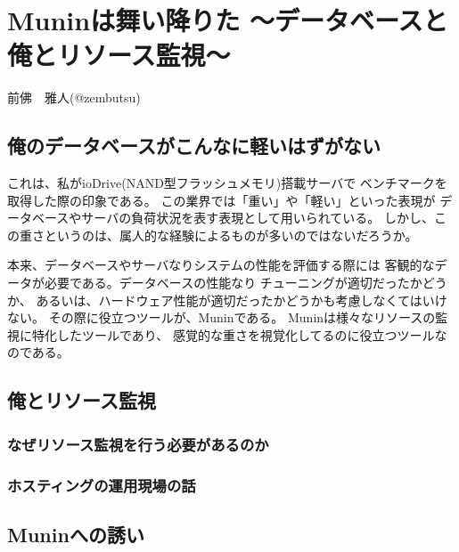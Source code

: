 
\chapter{Muninは舞い降りた ～データベースと俺とリソース監視～}

\begin{flushright}
 前佛　雅人(@zembutsu) %
\end{flushright}

\section{俺のデータベースがこんなに軽いはずがない}

これは、私がioDrive(NAND型フラッシュメモリ)搭載サーバで
ベンチマークを取得した際の印象である。
この業界では「重い」や「軽い」といった表現が
データベースやサーバの負荷状況を表す表現として用いられている。
しかし、この重さというのは、属人的な経験によるものが多いのではないだろうか。

本来、データベースやサーバなりシステムの性能を評価する際には
客観的なデータが必要である。データベースの性能なり
チューニングが適切だったかどうか、
あるいは、ハードウェア性能が適切だったかどうかも考慮しなくてはいけない。
その際に役立つツールが、Muninである。
Muninは様々なリソースの監視に特化したツールであり、
感覚的な重さを視覚化してるのに役立つツールなのである。

\section{俺とリソース監視}

\subsection{なぜリソース監視を行う必要があるのか}


\subsection{ホスティングの運用現場の話}


\section{Muninへの誘い}

